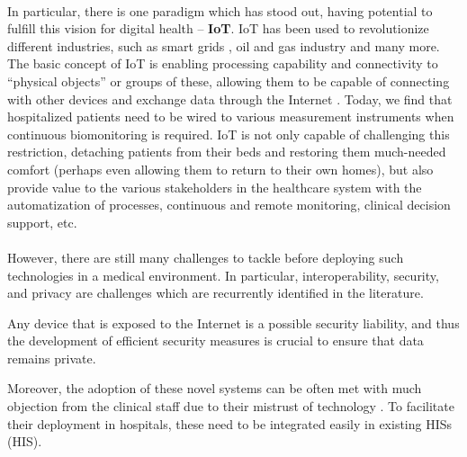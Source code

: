 \paragraph{} In particular, there is one paradigm which has stood out, having potential to fulfill this vision for digital health -- \textbf{\acf{IoT}}. \acs{IoT} has been used to revolutionize different industries, such as smart grids \cite{Faria2020}, oil and gas industry \cite{Shoja2018} and many more. The basic concept of \acs{IoT} is enabling processing capability and connectivity to ``physical objects'' or groups of these, allowing them to be capable of connecting with other devices and exchange data through the Internet \cite{gershenfeld2004internet}. Today, we find that hospitalized patients need to be wired to various measurement instruments when continuous biomonitoring is required. \acs{IoT} is not only capable of challenging this restriction, detaching patients from their beds and restoring them much-needed comfort (perhaps even allowing them to return to their own homes), but also provide value to the various stakeholders in the healthcare system with the automatization of processes, continuous and remote monitoring, clinical decision support, etc.

\paragraph{} However, there are still many challenges to tackle before deploying such technologies in a medical environment. In particular, interoperability, security, and privacy are challenges which are recurrently identified in the literature. 

Any device that is exposed to the Internet is a possible security liability, and thus the development of efficient security measures is crucial to ensure that data remains private. 

Moreover, the adoption of these novel systems can be often met with much objection from the clinical staff due to their mistrust of technology \cite{DursunErgezen2020}. To facilitate their deployment in hospitals, these need to be integrated easily in existing \acl{HIS}s (\acs{HIS}).



